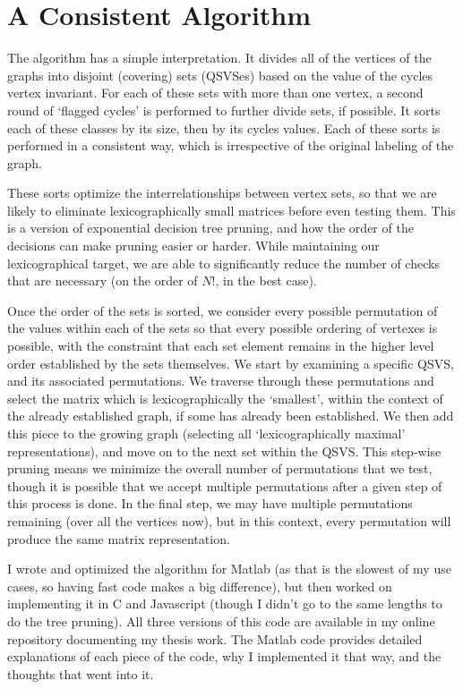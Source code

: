 \section{A Consistent Algorithm}
The algorithm has a simple interpretation. 
It divides all of the vertices of the graphs into disjoint (covering) sets (QSVSes) based on the value of the cycles vertex invariant.
For each of these sets with more than one vertex, a second round of `flagged cycles' is performed to further divide sets, if possible.
It sorts each of these classes by its size, then by its cycles values.
Each of these sorts is performed in a consistent way, which is irrespective of the original labeling of the graph.

These sorts optimize the interrelationships between vertex sets, so that we are likely to eliminate lexicographically small matrices before even testing them.
This is a version of exponential decision tree pruning, and how the order of the decisions can make pruning easier or harder.
While maintaining our lexicographical target, we are able to significantly reduce the number of checks that are necessary (on the order of $N!$, in the best case).

Once the order of the sets is sorted, we consider every possible permutation of the values within each of the sets so that every possible ordering of vertexes is possible, with the constraint that each set element remains in the higher level order established by the sets themselves.
We start by examining a specific QSVS, and its associated permutations.
We traverse through these permutations and select the matrix which is lexicographically the `smallest', within the context of the already established graph, if some has already been established.
We then add this piece to the growing graph (selecting all `lexicographically maximal' representations), and move on to the next set within the QSVS.
This step-wise pruning means we minimize the overall number of permutations that we test, though it is possible that we accept multiple permutations after a given step of this process is done.
In the final step, we may have multiple permutations remaining (over all the vertices now), but in this context, every permutation will produce the same matrix representation.

I wrote and optimized the algorithm for Matlab (as that is the slowest of my use cases, so having fast code makes a big difference), but then worked on implementing it in C and Javascript (though I didn't go to the same lengths to do the tree pruning).
All three versions of this code are available in my online repository documenting my thesis work.
The Matlab code provides detailed explanations of each piece of the code, why I implemented it that way, and the thoughts that went into it.

